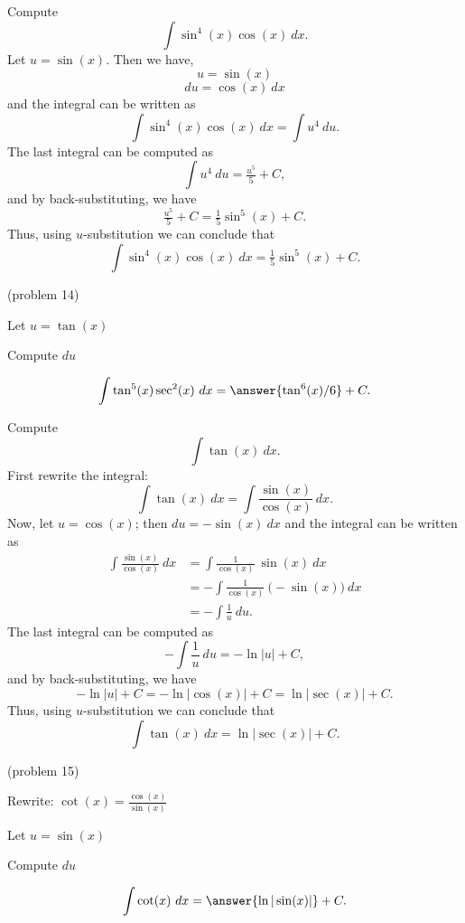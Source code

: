 \documentclass[handout]{ximera}
\begin{document}
\begin{example}[example 14] Compute 
\[\int \sin^4(x)\cos(x) \ dx.\]
Let $u = \sin(x)$. Then we have,
\[u = \sin(x)\]
\[du = \cos(x) \ dx\]
and the integral can be written as 
\[\int \sin^4(x)\cos(x) \ dx  = \int u^4 \ du.\]
The last integral can be computed as 
\[\int u^4 \ du = \tfrac{u^5}{5} + C,\]
and by back-substituting, we have 
\[\tfrac{u^5}{5} + C = \tfrac15 \sin^5(x) + C.\]
Thus, using $u$-substitution we can conclude that
\[\int \sin^4(x)\cos(x) \ dx =  \tfrac15 \sin^5(x) + C.\]
\end{example}



\begin{problem}(problem 14)
\begin{hint}
Let $u = \tan(x)$
\end{hint}
\begin{hint}
Compute $du$
\end{hint}
\[\int \tan^5(x)\sec^2(x) \ dx = \answer{\tan^6(x)/6} +C.\]
\end{problem}

\begin{example}[example 15] Compute 
\[\int \tan(x) \ dx.\]
First rewrite the integral:
\[\int \tan(x) \ dx =\int \frac{\sin(x)}{\cos(x)} \ dx.\]
Now, let $u = \cos(x)$; then $du = -\sin(x) \ dx$
and the integral can be written as
\begin{align*}
\int \frac{\sin(x)}{\cos(x)} \ dx &= \int \frac{1}{\cos(x)}\ \sin(x) \  dx \\
 &=  - \int \frac{1}{\cos(x)}\ \big(-\sin(x)\big) \  dx\\
&=-\int \frac{1}{u} \ du.
\end{align*}
The last integral can be computed as 
\[-\int \frac{1}{u} \ du = -\ln|u| + C,\]
and by back-substituting, we have 
\[-\ln|u| + C = -\ln|\cos(x)| + C = \ln|\sec(x)| +C.\]
Thus, using $u$-substitution we can conclude that
\[\int \tan(x) \ dx =  \ln|\sec(x)| + C.\]
\end{example}

\begin{problem}(problem 15)
\begin{hint}
Rewrite: $\cot(x) = \frac{\cos(x)}{\sin(x)}$
\end{hint}
\begin{hint}
Let $u = \sin(x)$
\end{hint}
\begin{hint}
Compute $du$
\end{hint}
\[\int \cot(x) \ dx = \answer{\ln|\sin(x)|} +C.\]


\end{problem}
\end{document}
